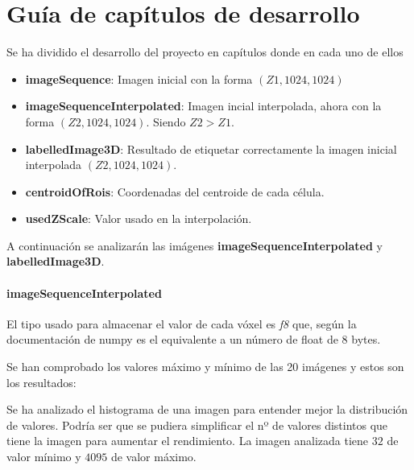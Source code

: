 \chapter{Gu\'ia de cap\'itulos de desarrollo}\label{guiacapitulos}

Se ha dividido el desarrollo del proyecto en capítulos donde en cada uno de ellos 

\begin{itemize}
\item \textbf{imageSequence}: Imagen inicial con la forma $ (Z1, 1024, 1024) $
\item \textbf{imageSequenceInterpolated}: Imagen incial interpolada, ahora con la forma $ (Z2, 1024, 1024) $. Siendo $ Z2 > Z1 $. 
\item \textbf{labelledImage3D}: Resultado de etiquetar correctamente la imagen inicial interpolada $ (Z2, 1024, 1024) $.
\item \textbf{centroidOfRois}: Coordenadas del centroide de cada célula.
\item \textbf{usedZScale}: Valor usado en la interpolación.
\end{itemize}

A continuación se analizarán las imágenes \textbf{imageSequenceInterpolated} y \textbf{labelledImage3D}.

\subsubsection{imageSequenceInterpolated}

El tipo usado para almacenar el valor de cada vóxel es \textit{f8} que, según la documentación de numpy es el equivalente a un número de float de 8 bytes.

Se han comprobado los valores máximo y mínimo de las 20 imágenes y estos son los resultados:


Se ha analizado el histograma de una imagen para entender mejor la distribución de valores. Podría ser que se pudiera simplificar el nº de valores distintos que tiene la imagen para aumentar el rendimiento. La imagen analizada tiene $ 32 $ de valor mínimo y $ 4095 $ de valor máximo.

